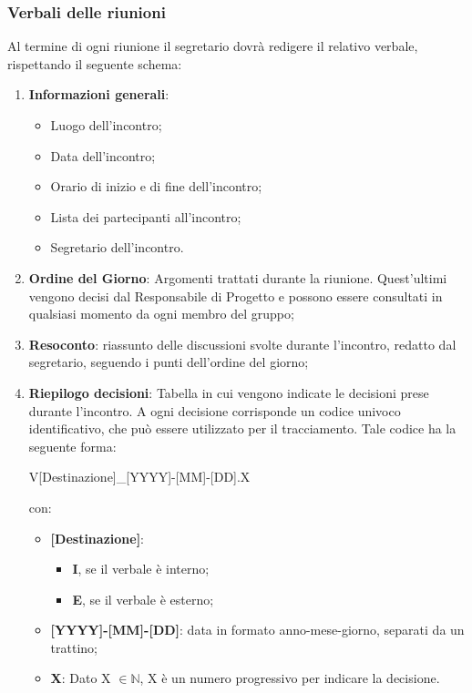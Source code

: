 \subsubsection{Verbali delle riunioni}
Al termine di ogni riunione il segretario dovrà redigere il relativo verbale, rispettando il seguente
schema:
\begin{enumerate}
	\item \textbf{Informazioni generali}:
		\begin{itemize}
			\item Luogo dell'incontro;
			\item Data dell'incontro;
			\item Orario di inizio e di fine dell'incontro;
			\item Lista dei partecipanti all'incontro;
			\item Segretario dell'incontro.
		\end{itemize}
	\item \textbf{Ordine del Giorno}: Argomenti trattati durante la riunione. Quest’ultimi vengono decisi dal Responsabile di Progetto e possono essere consultati in qualsiasi momento da ogni membro del gruppo;
	\item \textbf{Resoconto}: riassunto delle discussioni svolte durante l'incontro, redatto dal segretario, seguendo i punti dell’ordine del giorno;
	\item \textbf{Riepilogo decisioni}: Tabella in cui vengono indicate le decisioni prese durante l'incontro.
	A ogni decisione corrisponde un codice univoco identificativo, che può essere utilizzato per il tracciamento.
	Tale codice ha la seguente forma:
	\begin{center}
		V[Destinazione]\_[YYYY]-[MM]-[DD].X	
	\end{center}
	con:
	\begin{itemize}
		\item \textbf{[Destinazione]}:
		\begin{itemize}
			\item \textbf{I}, se il verbale è interno;
			\item \textbf{E}, se il verbale è esterno;
		\end{itemize}
		\item \textbf{[YYYY]-[MM]-[DD]}: data in formato anno-mese-giorno, separati da un trattino;
		\item \textbf{X}: Dato X $\in \mathbb{N}$, X è un numero progressivo per indicare la decisione.
	\end{itemize}
\end{enumerate}

